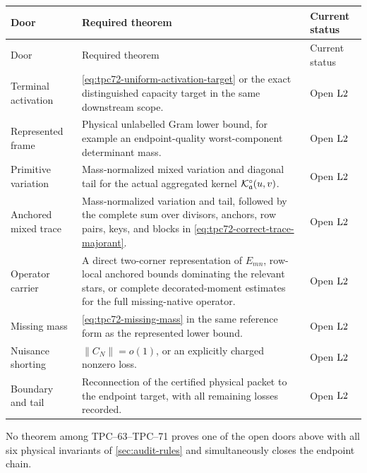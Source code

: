 \begin{longtable}{>{\raggedright\arraybackslash}p{}
                  >{\raggedright\arraybackslash}p{}
                  >{\raggedright\arraybackslash}p{}}
\toprule
Door & Required theorem & Current status\\
\midrule
\endfirsthead
\toprule
Door & Required theorem & Current status\\
\midrule
\endhead
Terminal activation
& \eqref{eq:tpc72-uniform-activation-target} or the exact distinguished
  capacity target in the same downstream scope.
& Open \(\mathrm{L2}\)\\
\addlinespace
Represented frame
& Physical unlabelled Gram lower bound, for example an endpoint-quality
  worst-component determinant mass.
& Open \(\mathrm{L2}\)\\
\addlinespace
Primitive variation
& Mass-normalized mixed variation and diagonal tail for the actual
  aggregated kernel \(\mathcal K_{\mathfrak a}^{\circ}(u,v)\).
& Open \(\mathrm{L2}\)\\
\addlinespace
Anchored mixed trace
& Mass-normalized variation and tail, followed by the complete sum over
  divisors, anchors, row pairs, keys, and blocks in
  \eqref{eq:tpc72-correct-trace-majorant}.
& Open \(\mathrm{L2}\)\\
\addlinespace
Operator carrier
& A direct two-corner representation of \(E_{mn}\), row-local anchored
  bounds dominating the relevant stars, or complete decorated-moment
  estimates for the full missing-native operator.
& Open \(\mathrm{L2}\)\\
\addlinespace
Missing mass
& \eqref{eq:tpc72-missing-mass} in the same reference form as the
  represented lower bound.
& Open \(\mathrm{L2}\)\\
\addlinespace
Nuisance shorting
& \(\|C_N\|=o(1)\), or an explicitly charged nonzero loss.
& Open \(\mathrm{L2}\)\\
\addlinespace
Boundary and tail
& Reconnection of the certified physical packet to the endpoint target,
  with all remaining losses recorded.
& Open \(\mathrm{L2}\)\\
\bottomrule
\end{longtable}

\begin{theorem}
\label{thm:no-L2-column}
No theorem among TPC--63--TPC--71 proves one of the open doors above with
all six physical invariants of \cref{sec:audit-rules} and simultaneously
closes the endpoint chain.
\end{theorem}

